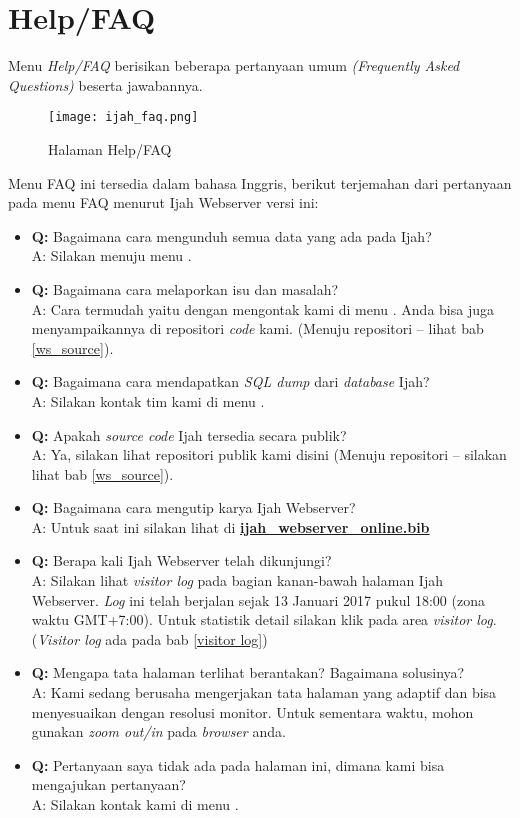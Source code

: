 \section{Help/FAQ}
Menu \emph{Help/FAQ} berisikan beberapa pertanyaan umum \emph{(Frequently Asked Questions)} beserta jawabannya.

\begin{figure}[H]
	\centering
	\texttt{[image: ijah\_faq.png]}
	\caption{Halaman Help/FAQ}
	\label{fig:ijah_faq}
\end{figure}

Menu FAQ ini tersedia dalam bahasa Inggris, berikut terjemahan dari pertanyaan pada menu FAQ menurut Ijah Webserver versi ini:

\begin{itemize}
\item {\textbf{Q:}} Bagaimana cara mengunduh semua data yang ada pada Ijah?\\
A: Silakan menuju menu \textbf{}.
\item {\textbf{Q:}} Bagaimana cara melaporkan isu dan masalah?\\
A: Cara termudah yaitu dengan mengontak kami di menu \textbf{}. Anda bisa juga menyampaikannya di repositori \emph{code} kami. (Menuju repositori -- lihat bab \ref{ws_source}).
\item {\textbf{Q:}} Bagaimana cara mendapatkan \emph{SQL dump} dari \emph{database} Ijah?\\
A: Silakan kontak tim kami di menu \textbf{}.
\item {\textbf{Q:}} Apakah \emph{source code} Ijah tersedia secara publik?\\
A: Ya, silakan lihat repositori publik kami disini (Menuju repositori -- silakan lihat bab \ref{ws_source}).
\item {\textbf{Q:}} Bagaimana cara mengutip karya Ijah Webserver?\\
A: Untuk saat ini silakan lihat di \href{http://ijah.apps.cs.ipb.ac.id/api/ijah_webserver_online.bib}{\textbf{ijah\_webserver\_online.bib}}
\item {\textbf{Q:}} Berapa kali Ijah Webserver telah dikunjungi?\\
A: Silakan lihat \emph{visitor log} pada bagian kanan-bawah halaman Ijah Webserver. \emph{Log} ini telah berjalan sejak 13 Januari 2017 pukul 18:00 (zona waktu GMT+7:00). Untuk statistik detail silakan klik pada area \emph{visitor log}. (\emph{Visitor log} ada pada bab \ref{visitor log})
\item {\textbf{Q:}} Mengapa tata halaman terlihat berantakan? Bagaimana solusinya?\\
A: Kami sedang berusaha mengerjakan tata halaman yang adaptif dan bisa menyesuaikan dengan resolusi monitor. Untuk sementara waktu, mohon gunakan \emph{zoom out/in} pada \emph{browser} anda.
\item {\textbf{Q:}} Pertanyaan saya tidak ada pada halaman ini, dimana kami bisa mengajukan pertanyaan?\\
A: Silakan kontak kami di menu \textbf{}.
\end{itemize}

